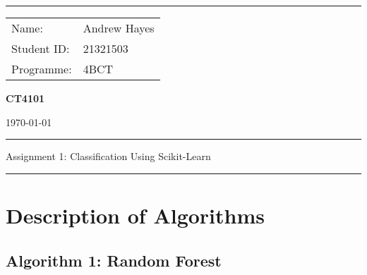 \documentclass[a4paper]{article}
\begin{document}
\hrule \medskip
\begin{minipage}{0.295\textwidth} 
    \vfill
    \raggedright
    \footnotesize 
    \begin{tabular}{@{}l l} %
        Name: & Andrew Hayes \\
        Student ID: & 21321503 \\
        Programme: & 4BCT \\
    \end{tabular}
    \vfill
\end{minipage}
\begin{minipage}{0.4\textwidth} 
    \centering 
    \Large 
    \vfill
    \textbf{CT4101}
    \vfill
\end{minipage}
\begin{minipage}{0.295\textwidth} 
    \raggedleft
    \vfill
    \today
    \vfill
\end{minipage}
\smallskip
\hrule 
\begin{center}
    \normalsize
    Assignment 1: Classification Using Scikit-Learn
\end{center}
\hrule

\section{Description of Algorithms}
\subsection{Algorithm 1: Random Forest}
\end{document}
